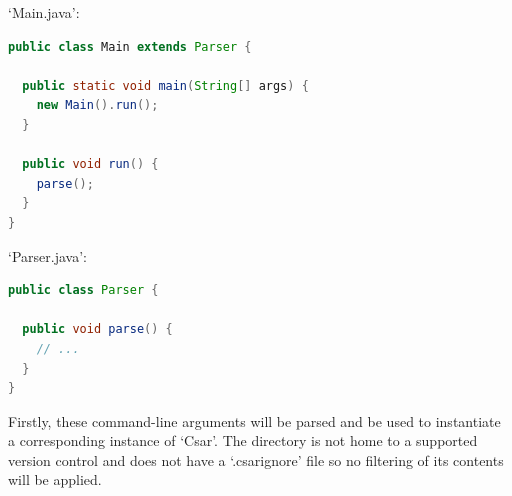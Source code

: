 \documentclass[12pt, letterpaper]{article}
\begin{document}
`Main.java':
\begin{lstlisting}[language=Java]
public class Main extends Parser {

  public static void main(String[] args) {
    new Main().run();
  }

  public void run() {
    parse();
  }
}
\end{lstlisting}

`Parser.java':
\begin{lstlisting}[language=Java]
public class Parser {

  public void parse() {
    // ...
  }
}
\end{lstlisting}

Firstly, these command-line arguments will be parsed and be used to instantiate a corresponding instance of `Csar'.
The directory is not home to a supported version control and does not have a `.csarignore' file so no filtering of its contents will be applied.
\end{document}

